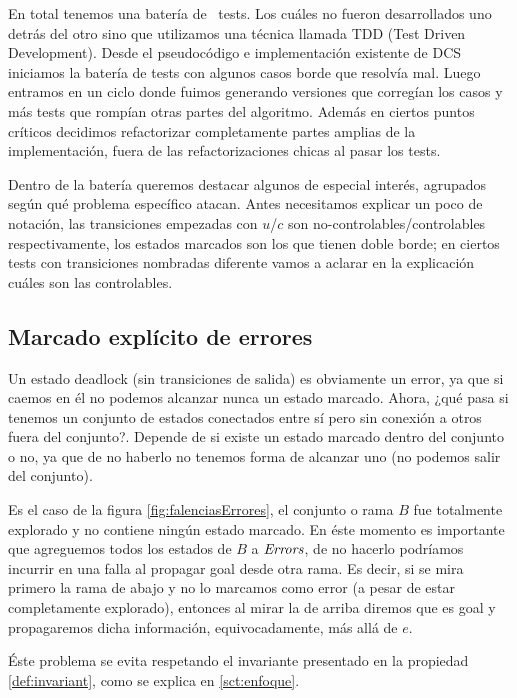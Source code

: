 En total tenemos una batería de \totalTests\ tests. Los cuáles no fueron desarrollados uno detrás del otro sino que utilizamos una técnica llamada TDD (Test Driven Development). Desde el pseudocódigo e implementación existente de DCS iniciamos la batería de tests con algunos casos borde que resolvía mal.
Luego entramos en un ciclo donde fuimos generando versiones que corregían los casos y más tests que rompían otras partes del algoritmo. Además en ciertos puntos críticos decidimos refactorizar completamente partes amplias de la implementación, fuera de las refactorizaciones chicas al pasar los tests.

Dentro de la batería queremos destacar algunos de especial interés, agrupados según qué problema específico atacan. Antes necesitamos explicar un poco de notación, las transiciones empezadas con $u$/$c$ son no-controlables/controlables respectivamente, los estados marcados son los que tienen doble borde; en ciertos tests con transiciones nombradas diferente vamos a aclarar en la explicación cuáles son las controlables.
\bigskip

\FloatBarrier
\subsection{Marcado explícito de errores}\label{marcarErrores}

Un estado deadlock (sin transiciones de salida) es obviamente un error, ya que si caemos en él no podemos alcanzar nunca un estado marcado. Ahora, ¿qué pasa si tenemos un conjunto de estados conectados entre sí pero sin conexión a otros fuera del conjunto?. Depende de si existe un estado marcado dentro del conjunto o no, ya que de no haberlo no tenemos forma de alcanzar uno (no podemos salir del conjunto). 

Es el caso de la figura \ref{fig:falenciasErrores}, el conjunto o rama $B$ fue totalmente explorado y no contiene ningún estado marcado. En éste momento es importante que agreguemos todos los estados de $B$ a $\mathit{Errors}$, de no hacerlo podríamos incurrir en una falla al propagar goal desde otra rama. Es decir, si se mira primero la rama de abajo y no lo marcamos como error (a pesar de estar completamente explorado), entonces al mirar la de arriba diremos que es goal y propagaremos dicha información, equivocadamente, más allá de $e$. 

Éste problema se evita respetando el invariante presentado en la propiedad \ref{def:invariant}, como se explica en \ref{sct:enfoque}. %

